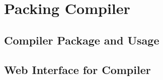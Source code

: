 \section{Packing Compiler}

\subsection{Compiler Package and Usage}

\subsection{Web Interface for Compiler}